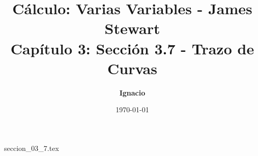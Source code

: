 \documentclass[11pt,spanish,oneside]{report}
\title{\textbf{Cálculo: Varias Variables - James Stewart} \\ \Large Capítulo 3: Sección 3.7 - Trazo de Curvas}
\author{\textbf{Ignacio}}
\date{\today}
\begin{document}
\maketitle

{seccion_03_7.tex}
\end{document}
